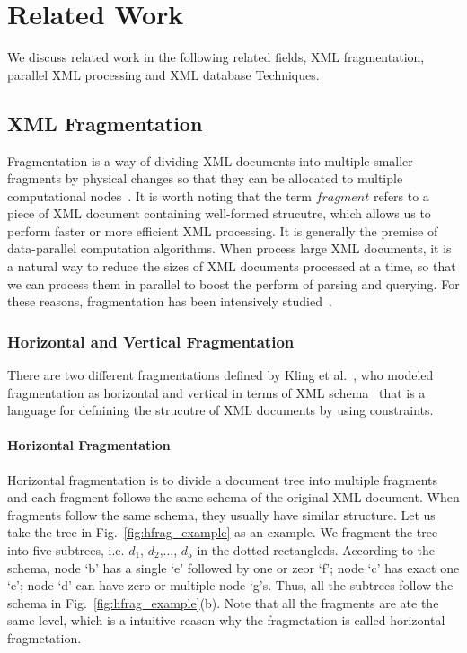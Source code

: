 

\chapter{Related Work} \label{sec:relatedwork}

We discuss related work in the following related fields, XML fragmentation,
parallel XML processing and XML database Techniques.

\section{XML Fragmentation}

Fragmentation is a way of dividing XML documents into multiple smaller fragments
by physical changes so that they can be allocated to multiple computational
nodes~\cite{BrMa14}. It is worth noting that the term $fragment$ refers to a
piece of XML document containing well-formed strucutre, which allows us to
perform faster or more efficient XML processing. It is generally the premise of
data-parallel computation algorithms. When process large XML documents, it is a
natural way to reduce the sizes of XML documents processed at a time, so that we
can process them in parallel to boost the perform of parsing and querying. For
these reasons, fragmentation has been intensively studied~\cite{ARBM06,DaGP14,
	CFKL12,NEMH07, OgTP13,LiZZ17, CFKL12,DaGP14}.


\subsection{Horizontal and Vertical Fragmentation}
\label{sec:hfragment}

There are two different fragmentations defined by Kling et
al.~\cite{kling11:dist_xml}, who modeled fragmentation as horizontal and
vertical in terms of XML schema~\cite{schema} that is a language for defnining
the strucutre of XML documents by using constraints.

\subsubsection{Horizontal Fragmentation}
\label{sec:vfragment}

Horizontal fragmentation is to divide a document tree into multiple fragments
and each fragment follows the same schema of the original XML document. When
fragments follow the same schema, they usually have similar structure.  Let us
take the tree in Fig.~\ref{fig:hfrag_example} as an example. We fragment the
tree into five subtrees, i.e. $d_1$, $d_2$,..., $d_5$ in the dotted rectangleds.
According to the schema, node `b' has a single `e' followed by one or zeor  `f';
node `c' has exact one `e'; node `d' can have zero or multiple node `g's. Thus,
all the subtrees follow the schema in Fig.~\ref{fig:hfrag_example}(b). Note that
all the fragments are ate the same level, which is a intuitive reason why the
fragmetation is called horizontal fragmetation.



